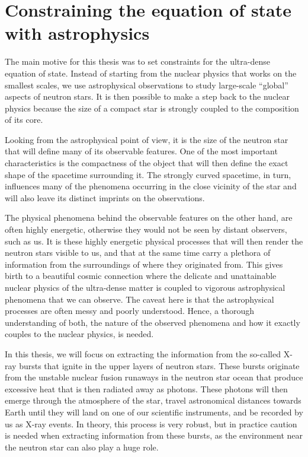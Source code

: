 \chapter{Constraining the equation of state with astrophysics}


The main motive for this thesis was to set constraints for the ultra-dense equation of state.
Instead of starting from the nuclear physics that works on the smallest scales, we use astrophysical observations to study large-scale ``global'' aspects of neutron stars.
It is then possible to make a step back to the nuclear physics because the size of a compact star is strongly coupled to the composition of its core.

Looking from the astrophysical point of view, it is the size of the neutron star that will define many of its observable features.
One of the most important characteristics is the compactness of the object that will then define the exact shape of the spacetime surrounding it.
The strongly curved spacetime, in turn, influences many of the phenomena occurring in the close vicinity of the star and will also leave its distinct imprints on the observations.

The physical phenomena behind the observable features on the other hand, are often highly energetic, otherwise they would not be seen by distant observers, such as us.
It is these highly energetic physical processes that will then render the neutron stars visible to us, and that at the same time carry a plethora of information from the surroundings of where they originated from.
This gives birth to a beautiful cosmic connection where the delicate and unattainable nuclear physics of the ultra-dense matter is coupled to vigorous astrophysical phenomena that we can observe.
The caveat here is that the astrophysical processes are often messy and poorly understood.
Hence, a thorough understanding of both, the nature of the observed phenomena and how it exactly couples to the nuclear physics, is needed.

In this thesis, we will focus on extracting the information from the so-called X-ray bursts that ignite in the upper layers of neutron stars.
These bursts originate from the unstable nuclear fusion runaways in the neutron star ocean that produce excessive heat that is then radiated away as photons.
These photons will then emerge through the atmosphere of the star, travel astronomical distances towards Earth until they will land on one of our scientific instruments, and be recorded by us as X-ray events.
In theory, this process is very robust, but in practice caution is needed when extracting information from these bursts, as the environment near the neutron star can also play a huge role.

